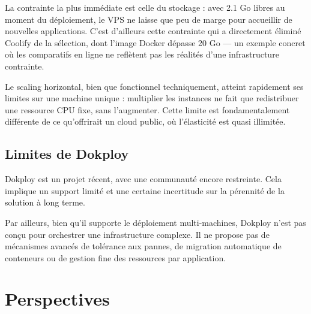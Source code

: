 \documentclass{rapportClass} %
\begin{document}
La contrainte la plus immédiate est celle du stockage : avec 2.1 Go
libres au moment du déploiement, le VPS ne laisse que peu de marge
pour accueillir de nouvelles applications. C'est d'ailleurs cette
contrainte qui a directement éliminé Coolify de la sélection, dont
l'image Docker dépasse 20 Go — un exemple concret où les comparatifs
en ligne ne reflètent pas les réalités d'une infrastructure contrainte.

Le scaling horizontal, bien que fonctionnel techniquement, atteint
rapidement ses limites sur une machine unique : multiplier les
instances ne fait que redistribuer une ressource CPU fixe, sans
l'augmenter. Cette limite est fondamentalement différente de ce
qu'offrirait un cloud public, où l'élasticité est quasi illimitée.

\subsection{Limites de Dokploy}

Dokploy est un projet récent, avec une communauté encore restreinte.
Cela implique un support limité et une certaine incertitude sur la
pérennité de la solution à long terme.

Par ailleurs, bien qu'il supporte le déploiement multi-machines,
Dokploy n'est pas conçu pour orchestrer une infrastructure complexe.
Il ne propose pas de mécanismes avancés de tolérance aux pannes, de
migration automatique de conteneurs ou de gestion fine des ressources
par application.




\section{Perspectives}
\end{document}
